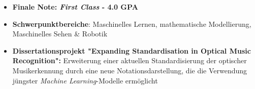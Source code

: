 \documentclass[10pt,a4paper,ragged2e,withhyper]{altacv}
\begin{document}
\begin{paracol}{2}



\begin{itemize}
    \item \textbf{Finale Note: \emph{First Class} - 4.0 GPA}
    \item \textbf{Schwerpunktbereiche}: Maschinelles Lernen, mathematische Modellierung, Maschinelles Sehen \& Robotik
    \item \textbf{Dissertationsprojekt "Expanding Standardisation in Optical Music Recognition":} Erweiterung einer aktuellen Standardisierung der optischer Musikerkennung durch eine neue  Notationsdarstellung, die die Verwendung jüngster \emph{Machine Learning}-Modelle ermöglicht
\end{itemize}

\newpage









\switchcolumn


\end{paracol}
\end{document}
